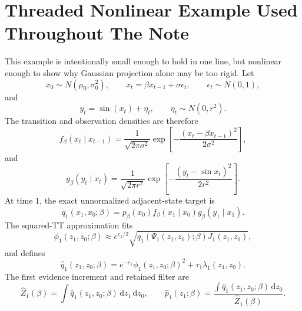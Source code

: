 \documentclass[11pt]{article}
\numberwithin{equation}{section}
\newcommand{\dd}{\,\mathrm d}
\begin{document}
\section{Threaded Nonlinear Example Used Throughout The Note}

This example is intentionally small enough to hold in one line, but nonlinear
enough to show why Gaussian projection alone may be too rigid.  Let
\begin{equation}
    x_0\sim N(\mu_0,\sigma_0^2),
    \qquad
    x_t=\beta x_{t-1}+\sigma\epsilon_t,
    \qquad
    \epsilon_t\sim N(0,1),
    \label{eq:p24-p23-e1}
\end{equation}
and
\begin{equation}
    y_t=\sin(x_t)+\eta_t,
    \qquad
    \eta_t\sim N(0,r^2).
    \label{eq:p24-p23-e2}
\end{equation}
The transition and observation densities are therefore
\begin{equation}
    f_\beta(x_t\mid x_{t-1})
    =
    \frac{1}{\sqrt{2\pi\sigma^2}}
    \exp\!\left[-\frac{(x_t-\beta x_{t-1})^2}{2\sigma^2}\right],
    \label{eq:p24-p23-e3}
\end{equation}
and
\begin{equation}
    g_\beta(y_t\mid x_t)
    =
    \frac{1}{\sqrt{2\pi r^2}}
    \exp\!\left[-\frac{(y_t-\sin x_t)^2}{2r^2}\right].
    \label{eq:p24-p23-e4}
\end{equation}
At time \(1\), the exact unnormalized adjacent-state target is
\begin{equation}
    q_1(x_1,x_0;\beta)
    =
    p_\beta(x_0)
    f_\beta(x_1\mid x_0)
    g_\beta(y_1\mid x_1).
    \label{eq:p24-p23-e5}
\end{equation}
The squared-TT approximation fits
\begin{equation}
    \phi_1(z_1,z_0;\beta)
    \approx
    e^{c_1/2}
    \sqrt{
    q_1(\Psi_1(z_1,z_0);\beta)
    J_1(z_1,z_0)},
    \label{eq:p24-p23-e6}
\end{equation}
and defines
\begin{equation}
    \widehat q_1(z_1,z_0;\beta)
    =
    e^{-c_1}\phi_1(z_1,z_0;\beta)^2
    +
    \tau_1\lambda_1(z_1,z_0).
    \label{eq:p24-p23-e7}
\end{equation}
The first evidence increment and retained filter are
\begin{equation}
    \widehat Z_1(\beta)
    =
    \int\widehat q_1(z_1,z_0;\beta)\dd z_1\dd z_0,
    \qquad
    \widehat p_1(z_1;\beta)
    =
    \frac{\int\widehat q_1(z_1,z_0;\beta)\dd z_0}
    {\widehat Z_1(\beta)}.
    \label{eq:p24-p23-e8}
\end{equation}
\end{document}

